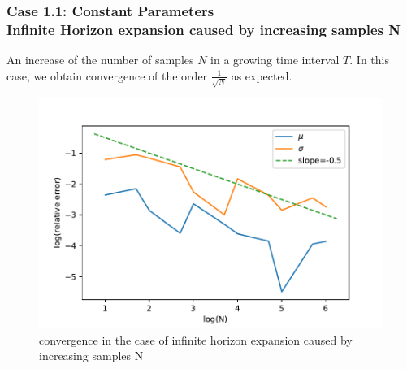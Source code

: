 \documentclass[aspectratio=169]{beamer}\usepackage[utf8]{inputenc}
\begin{document}
\begin{frame}\frametitle{ Case 1.1: Constant Parameters \\
 Infinite Horizon expansion caused by increasing samples N }
An increase of the number of samples $N$ in a growing time interval $T$. In this case, we obtain  convergence of the order $\frac{1}{\sqrt{N}}$ as expected.

\begin{figure}
  \includegraphics[scale=0.45]{Figures/case11v2.pdf}
  \caption{convergence in the case of infinite horizon expansion caused by increasing samples N}
\end{figure}

\end{frame}
\end{document}
